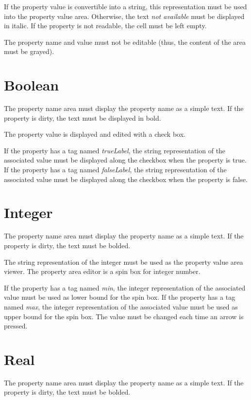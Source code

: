 \documentclass[a4paper, twoside]{report}
\begin{document}
If the property value is convertible into a string, this representation must be used into the
property value area. Otherwise, the text \emph{not available} must be displayed in italic. If the
property is not readable, the cell must be left empty.

The property name and value must not be editable (thus, the content of the area must be grayed).

\section{Boolean}

The property name area must display the property name as a simple text. If the property is dirty,
the text must be displayed in bold.

The property value is displayed and edited with a check box.

If the property has a tag named \emph{trueLabel}, the string representation of the associated value
must be displayed along the checkbox when the property is true.
If the property has a tag named \emph{falseLabel}, the string representation of the associated value
must be displayed along the checkbox when the property is false.

\section{Integer}

The property name area must display the property name as a simple text. If the property is dirty,
the text must be bolded.

The string representation of the integer must be used as the property value area viewer.
The property area editor is a spin box for integer number.

If the property has a tag named \emph{min}, the integer representation of the associated value must
be used as lower bound for the spin box.
If the property has a tag named \emph{max}, the integer representation of the associated value must
be used as upper bound for the spin box. The value must be changed each time an arrow is pressed.

\section{Real}

The property name area must display the property name as a simple text. If the property is dirty,
the text must be bolded.
\end{document}
